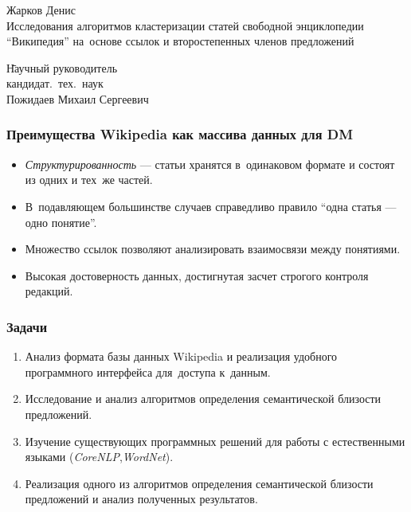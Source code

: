 \documentclass{beamer}
\begin{document}
\sloppy

\begin{frame}
\begin{center}
Жарков Денис\\
\vspace{1cm}
{\Large Исследования алгоритмов кластеризации статей свободной энциклопедии ``Википедия'' 
на~основе ссылок и второстепенных членов предложений}
\end{center}
\begin{tabbing}
\hspace{6.5cm} \= Научный руководитель\\
\> кандидат.~тех.~наук\\
\> Пожидаев Михаил Сергеевич\\
\end{tabbing}
\end{frame}

\begin{frame}
\frametitle{Преимущества Wikipedia как массива данных для DM}
\begin{itemize}
\item{
\textit{Структурированность} --- статьи хранятся в~одинаковом формате
и состоят из одних и тех~же частей. 
}
\item{
В~подавляющем большинстве случаев справедливо
правило ``одна статья --- одно понятие''.
}
\item{
Множество ссылок позволяют анализировать взаимосвязи между понятиями.
}
\item{
Высокая достоверность данных, достигнутая засчет строгого контроля редакций.
}
\end{itemize}
\end{frame}

\begin{frame}
\frametitle{Задачи}
\begin{enumerate}
\item {
Анализ формата базы данных Wikipedia и реализация удобного программного интерфейса 
для~доступа к~данным.
}
\item {
Исследование и анализ алгоритмов определения семантической близости предложений.
}
\item {
Изучение существующих программных решений для работы с естественными языками (\textit{CoreNLP},\textit{WordNet}).
}
\item{
Реализация одного из алгоритмов определения семантической близости предложений и
анализ полученных результатов.
}
\end{enumerate}
\end{frame}
\end{document}
